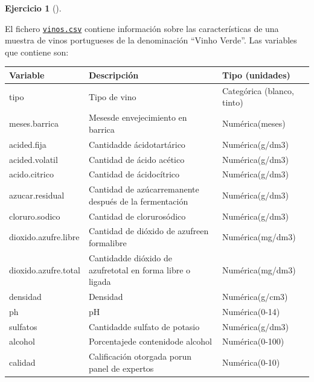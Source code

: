 \documentclass[
  a4paper,
]{scrreport}
\theoremstyle{definition}
\newtheorem{exercise}{Ejercicio}[chapter]
\theoremstyle{remark}
\begin{document}
\begin{exercise}[]\protect\hypertarget{exr-preprocesaimento-5}{}\label{exr-preprocesaimento-5}

El fichero \href{datos/vinos.csv}{\texttt{vinos.csv}} contiene
información sobre las características de una muestra de vinos
portugueses de la denominación ``Vinho Verde''. Las variables que
contiene son:

\begin{longtable}[]{@{}
  >{\raggedright\arraybackslash}p{}
  >{\raggedright\arraybackslash}p{}
  >{\raggedright\arraybackslash}p{}@{}}
\toprule\noalign{}
\begin{minipage}[b]{\linewidth}\raggedright
Variable
\end{minipage} & \begin{minipage}[b]{\linewidth}\raggedright
Descripción
\end{minipage} & \begin{minipage}[b]{\linewidth}\raggedright
Tipo (unidades)
\end{minipage} \\
\midrule\noalign{}
\endhead
\bottomrule\noalign{}
\endlastfoot
tipo & Tipo de vino & Categórica (blanco, tinto) \\
meses.barrica & Mesesde envejecimiento en barrica & Numérica(meses) \\
acided.fija & Cantidadde ácidotartárico & Numérica(g/dm3) \\
acided.volatil & Cantidad de ácido acético & Numérica(g/dm3) \\
acido.citrico & Cantidad de ácidocítrico & Numérica(g/dm3) \\
azucar.residual & Cantidad de azúcarremanente después de la fermentación
& Numérica(g/dm3) \\
cloruro.sodico & Cantidad de clorurosódico & Numérica(g/dm3) \\
dioxido.azufre.libre & Cantidad de dióxido de azufreen formalibre &
Numérica(mg/dm3) \\
dioxido.azufre.total & Cantidadde dióxido de azufretotal en forma libre
o ligada & Numérica(mg/dm3) \\
densidad & Densidad & Numérica(g/cm3) \\
ph & pH & Numérica(0-14) \\
sulfatos & Cantidadde sulfato de potasio & Numérica(g/dm3) \\
alcohol & Porcentajede contenidode alcohol & Numérica(0-100) \\
calidad & Calificación otorgada porun panel de expertos &
Numérica(0-10) \\
\end{longtable}


\end{exercise}
\end{document}
